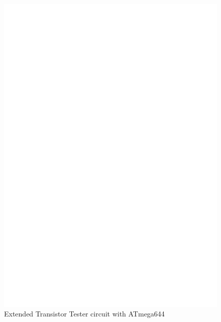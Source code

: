 \begin{figure}[H]
\centering
\includegraphics[width=18cm]{../FIG/t644tester.eps}
\caption{Extended Transistor Tester circuit with ATmega644}
\label{fig:t644tester}
\end{figure}


